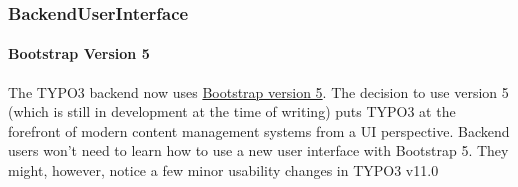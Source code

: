 %

\begin{frame}[fragile]
	\frametitle{BackendUserInterface}
	\framesubtitle{Bootstrap Version 5}

	The TYPO3 backend now uses
	\href{https://getbootstrap.com/}{Bootstrap version 5}.
	\newline
	The decision to use version 5 (which is still in development at the time of
	writing) puts TYPO3 at the forefront of modern content management systems
	from a UI perspective.
	\newline
	Backend users won't need to learn how to use a new user interface with
	Bootstrap 5. They might, however, notice a few minor usability changes in
	TYPO3 v11.0

\end{frame}

